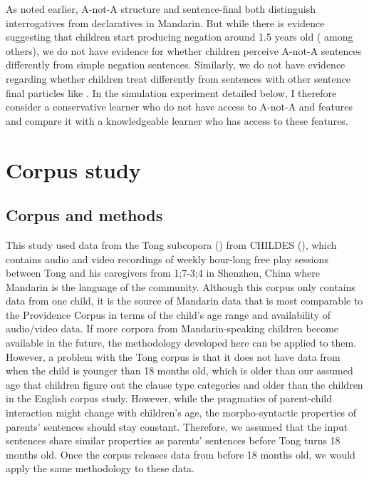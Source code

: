  As noted earlier, A-not-A structure and sentence-final  both distinguish interrogatives from declaratives in Mandarin. But while there is evidence suggesting that children start producing negation around 1.5 years old (\cite{lee1982,fan2007,li2019neg, huang2022manchild} among others), we do not have evidence for whether children perceive A-not-A sentences differently from simple negation sentences. Similarly, we do not have evidence regarding whether children treat  differently from sentences with other sentence final particles like . In the simulation experiment detailed below, I therefore consider a conservative learner who do not have access to A-not-A and  features and compare it with a knowledgeable learner who has access to these features. 





\section{Corpus study}
\label{sec:mancl:corpus}

\subsection{Corpus and methods}
\label{sec:mancl:corpus:method}
This study used data from the Tong subcopora (\cite{TongCorpus}) from CHILDES (\cite{CHILDES}), which contains audio and video recordings of weekly hour-long free play sessions between Tong and his caregivers from 1;7-3;4 in Shenzhen, China where Mandarin is the language of the community. Although this corpus only contains data from one child, it is the source of Mandarin data that is most comparable to the Providence Corpus in terms of the child’s age range and availability of audio/video data. If more corpora from Mandarin-speaking children become available in the future, the methodology developed here can be applied to them. However, a problem with the Tong corpus is that it does not have data from when the child is younger than 18 months old, which is older than our assumed age that children figure out the clause type categories and older than the children in the English corpus study. However, while the pragmatics of parent-child interaction might change with children's age, the morpho-syntactic properties of parents' sentences should stay constant. Therefore, we assumed that the input sentences share similar properties as parents' sentences before Tong turns 18 months old. Once the corpus releases data from before 18 months old, we would apply the same methodology to these data. 

